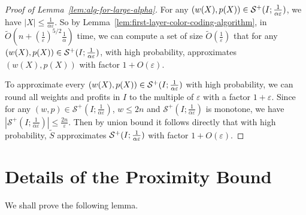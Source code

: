 \documentclass[a4paper,UKenglish,cleveref, autoref, thm-restate, pdfa]{lipics-v2021}
\newcommand{\eps}{\varepsilon}
\renewcommand{\leq}{\leqslant}
\begin{document}
\begin{proof}[Proof of Lemma~\ref{lem:alg-for-large-alpha}]
    For any $(w(X),p(X))\in {\cal S}^+(I;\frac{1}{\alpha\eps})$, we have $|X|\leq \frac{1}{\alpha\eps}$. So by Lemma~\ref{lem:first-layer-color-coding-algorithm},
    in $\tilde{O}(n + (\frac{1}{\eps})^{5/2}\frac{1}{\alpha})$ time, we can compute a set of size $\tilde{O}(\frac{1}{\eps})$ that for any $(w(X),p(X))\in {\cal S}^+(I;\frac{1}{\alpha\eps})$, with high probability, approximates $(w(X),p(X))$ with factor $1 + O(\eps)$.
    
    To approximate every $(w(X),p(X))\in {\cal S}^+(I;\frac{1}{\alpha\eps})$ with high probability, we can round all weights and profits in $I$ to the multiple of $\eps$ with a factor $1+\eps$. Since for any $(w,p)\in\mathcal{S}^+(I;\frac{1}{\alpha\eps})$, $w\leq 2n$ and $\mathcal{S}^+(I;\frac{1}{\alpha\eps})$ is monotone, we have $|\mathcal{S}^+(I;\frac{1}{\alpha\eps})|\leq \frac{2n}{\eps}$.
Then by union bound it follows directly that with high probability, $\tilde{S}$ approximates ${\cal S}^+(I; \frac{1}{\alpha\eps})$ with factor $1 + O(\eps)$. 
\end{proof}


\section{Details of the Proximity Bound}\label{app:proximity}
We shall prove the following lemma.
\lemproximity*
    
\end{document}
